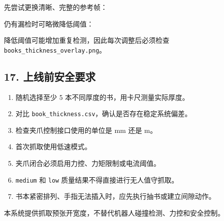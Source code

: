 \documentclass[
  chinese,
  11pt,
  a4paper,
]{article}
\newenvironment{Shaded}{\begin{snugshade}}{\end{snugshade}}
\newcommand{\AttributeTok}[1]{\textcolor[rgb]{0.13,0.29,0.53}{#1}}
\newcommand{\DataTypeTok}[1]{\textcolor[rgb]{0.13,0.29,0.53}{#1}}
\newcommand{\NormalTok}[1]{#1}
\newcommand{\OperatorTok}[1]{\textcolor[rgb]{0.81,0.36,0.00}{\textbf{#1}}}
\newcommand{\StringTok}[1]{\textcolor[rgb]{0.31,0.60,0.02}{#1}}
\newcommand{\VariableTok}[1]{\textcolor[rgb]{0.00,0.00,0.00}{#1}}
\providecommand{\tightlist}{%
  \setlength{\itemsep}{0pt}\setlength{\parskip}{0pt}}
\begin{document}
先尝试更换清晰、完整的参考帧：

\begin{Shaded}
\end{Shaded}

仍有漏检时可略微降低阈值：

\begin{Shaded}
\end{Shaded}

降低阈值可能增加重复检测，因此每次调整后必须检查
\texttt{books\_thickness\_overlay.png}。

\subsection{17.
上线前安全要求}\label{17-ux4e0aux7ebfux524dux5b89ux5168ux8981ux6c42}

\begin{enumerate}
\def\labelenumi{\arabic{enumi}.}
\tightlist
\item
  随机选择至少 5 本不同厚度的书，用卡尺测量实际厚度。
\item
  对比 \texttt{book\_thickness.csv}，确认是否存在稳定系统偏差。
\item
  检查夹爪控制接口使用的单位是 mm 还是 m。
\item
  首次抓取使用低速模式。
\item
  夹爪闭合必须启用力控、力矩限制或电流阈值。
\item
  \texttt{medium} 和 \texttt{low} 质量结果不得直接进行无人值守抓取。
\item
  书本紧密排列、手指无法插入时，应先执行抽书或建立间隙动作。
\end{enumerate}

本系统提供抓取预张开宽度，不替代机器人碰撞检测、力控和安全控制。
\end{document}
